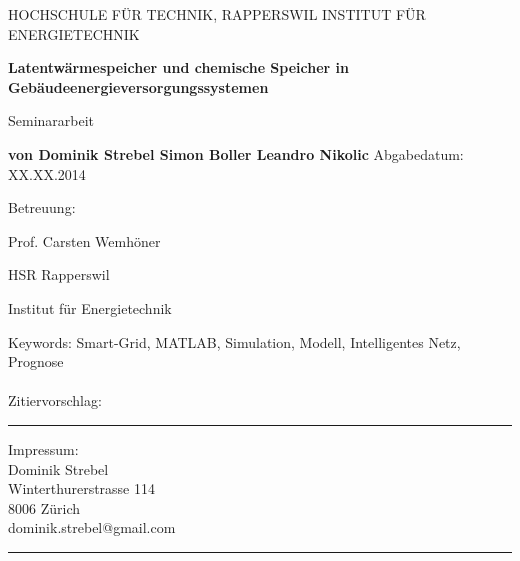 
\begin{titlepage}
\begin{center}
HOCHSCHULE FÜR TECHNIK, RAPPERSWIL
\linebreak INSTITUT FÜR ENERGIETECHNIK
\end{center}
\vspace{2.5cm}
\begin{center}
\textbf{Latentwärmespeicher und chemische Speicher
in Gebäudeenergieversorgungssystemen}
\linebreak
\end{center}
\vspace{1.8cm}
\begin{center}
Seminararbeit
\end{center}
\vspace{1cm}
\begin{center}
\textbf{von \linebreak Dominik Strebel \linebreak Simon Boller \linebreak
Leandro Nikolic} \linebreak
\linebreak 
Abgabedatum: XX.XX.2014
\linebreak
\end{center}
\vspace{5cm}
\noindent Betreuung:

\noindent Prof. Carsten Wemhöner

\noindent HSR Rapperswil

\noindent Institut für Energietechnik

\end{titlepage}
\renewcommand{\footrulewidth}{0pt}
\renewcommand{\headrulewidth}{0pt}
\lhead{}
\chead{}
\rhead{}
\cfoot{} 


 \vspace*{13.5cm}
\begin{minipage}{80mm}
	Keywords: Smart-Grid, MATLAB, Simulation, Modell, Intelligentes Netz, Prognose
 \\
	\\
	Zitiervorschlag: 
	\vspace{1cm}


  \rule{80mm}{2pt}
  Impressum: \\
  Dominik Strebel \\
  Winterthurerstrasse 114 \\
  8006 Zürich\\
  dominik.strebel@gmail.com\\
  \rule{80mm}{2pt}
\end{minipage}
\newpage

